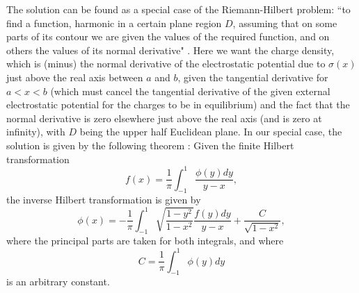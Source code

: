 The solution can be found  as a special case of the Riemann-Hilbert
problem:
``to find a function, harmonic in a certain plane region $D$,
assuming that on
some parts of its contour we are given the values of the required
function, and
on others the values of its normal derivative" \cite{Mik}.  Here we
want the
charge density, which is (minus) the normal derivative of the
electrostatic
potential due to $\sigma(x)$ just above the real axis between $a$ and
$b$,
given the tangential derivative for $a<x<b$ (which must cancel the
tangential
derivative of the given external electrostatic potential for the
charges to be
in equilibrium) and the fact that the normal derivative is zero
elsewhere just
above the real axis (and is zero at infinity), with $D$ being the
upper half
Euclidean plane.  In our special case, the solution is given by the
following
theorem \cite{Tri1,Tri2}:  Given the finite Hilbert transformation
	\begin{equation}
        f(x) = \frac{1}{\pi}\int _{-1}^{1}\frac{\phi(y)dy}{y-x},
	\end{equation}
the inverse Hilbert transformation is given by
	\begin{equation}
        \phi(x) = -\frac{1}{\pi}\int _{-1}^{1}
	\sqrt{\frac{1-y^2}{1-x^2}}\frac{f(y)dy}{y-x}
	+\frac{C}{\sqrt{1-x^2}},
	\end{equation}
where the principal parts are taken for both integrals, and where
	\begin{equation}
        C = \frac{1}{\pi}\int _{-1}^{1}\phi(y)dy
	\end{equation}
is an arbitrary constant.

